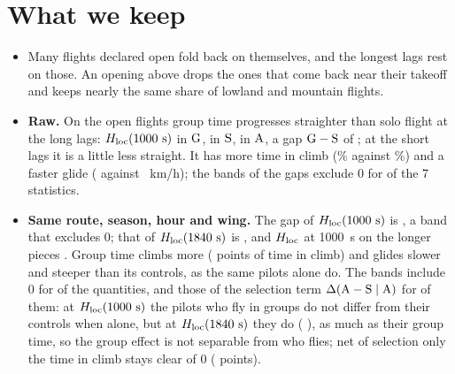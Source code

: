 \section{What we keep}\label{sec:conclusions}

\begin{table}
\centering\scriptsize
\setlength{\tabcolsep}{3pt}

\caption{The four comparisons side by side, with 90\% bands. Raw: $\G-\Sl$ on the flights of Section~\ref{sec:raw} (dataset 1000 for $\Hk$, 2760 for $\Hq$, average first, unit the flight); same route, selection: pieces, level all;
before and after: $g$ on windows. $^\circ$: the band includes 0. $g$ has no value at $\Hq$: the windows are too short.}
\label{tab:summary}
\end{table}

\begin{itemize}
  \item Many flights declared open fold back on themselves, and the longest lags rest on those. An opening above \MinOpening{} drops the ones that come back near their takeoff and keeps nearly the same share of lowland and mountain flights.
  \item \textbf{Raw.} On the open flights group time progresses straighter than solo flight at the long lags: $\Hk$ \RawHKOneG{} in $\mathrm{G}$, \RawHKOneS{} in $\mathrm{S}$, \RawHKOneA{} in $\mathrm{A}$, a gap $\G-\Sl$ of \RawGapHK{} \RawGapHKBand; at the short lags it is a little less straight.
  It has more time in climb (\RawStatClimbG\% against \RawStatClimbS\%) and a faster glide (\RawStatGlideG{} against \RawStatGlideS~km/h); the bands of the gaps exclude 0 for \RawNonZeroCount{} of the 7 statistics.
  \item \textbf{Same route, season, hour and wing.} The gap of $\Hk$ is \MatDeltaHKG{} \MatDeltaHKGBand, a band that excludes 0; that of $\Hq$ is \MatDeltaHQG{} \MatDeltaHQGBand, and $H_\mathrm{loc}$ at 1000~s on the longer pieces \MatDeltaHKLongG{} \MatDeltaHKLongGBand. Group time climbs more (\MatDeltaClimbG{} points of time in climb)
  and glides slower and steeper than its controls, as the same pilots alone do. The bands include 0 for \MatZeroG{} of the \MatNQuant{} quantities, and those of the selection term $\Delta(\mathrm{A}-\mathrm{S}\mid\mathrm{A})$ for \MatZeroA{} of them: at $\Hk$ the pilots who fly in groups do not differ from their controls when alone, but at $\Hq$ they do (\MatDeltaHQA{} \MatDeltaHQABand), as much as their group time, so the group effect is not separable from who flies; net of selection only the time in climb stays clear of 0 (\MatDeltaClimbD{} \MatDeltaClimbDBand{} points).

\end{itemize}
